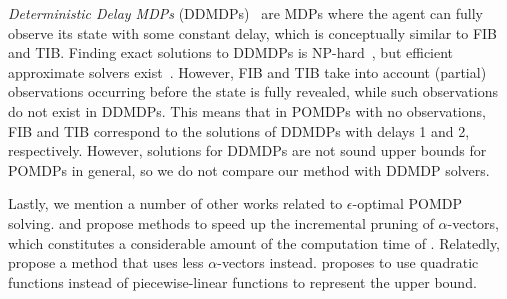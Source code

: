 \emph{Deterministic Delay MDPs} (DDMDPs)~\cite{DBLP:conf/sigmetrics/AltmanN92,DBLP:journals/tac/KatsikopoulosE03,DBLP:journals/aamas/WalshNLL09} are MDPs where the agent can fully observe its state with some constant delay, which is conceptually similar to FIB and TIB. 
Finding exact solutions to DDMDPs is NP-hard~\cite{DBLP:journals/aamas/WalshNLL09}, but efficient approximate solvers exist~\cite{DBLP:journals/prl/AgarwalA21,DBLP:conf/iclr/DermanDM21}.
However, FIB and TIB  take into account (partial) observations occurring before the state is fully revealed, while such observations do not exist in DDMDPs.
This means that in POMDPs with no observations, FIB and TIB correspond to the solutions of DDMDPs with delays 1 and 2, respectively.
However, solutions for DDMDPs are not sound upper bounds for POMDPs in general, so we do not compare our method with DDMDP solvers.

Lastly, we mention a number of other works related to $\epsilon$-optimal POMDP solving.
\citet{DBLP:conf/aaai/WalravenS17} and \citet{DBLP:conf/uai/HansenB20} propose methods to speed up the incremental pruning of $\alpha$-vectors, which constitutes a considerable amount of the computation time of \SARSOP. 
Relatedly, \citet{DBLP:conf/aaai/DujardinDC17} propose a method that uses less $\alpha$-vectors instead.
\citet{DBLP:conf/aaai/WangPBS06} proposes to use quadratic functions instead of piecewise-linear functions to represent the upper bound.
